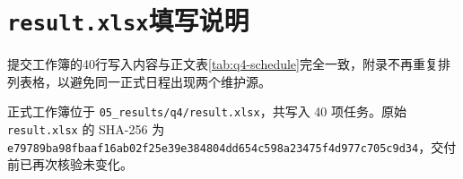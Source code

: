 \section{\texttt{result.xlsx}填写说明}

提交工作簿的40行写入内容与正文表\ref{tab:q4-schedule}完全一致，附录不再重复排列表格，以避免同一正式日程出现两个维护源。

正式工作簿位于 \texttt{05\_results/q4/result.xlsx}，共写入 40 项任务。原始 \texttt{result.xlsx} 的 SHA-256 为 \texttt{e79789ba98fbaaf16ab02f25e39e384804dd654c598a23475f4d977c705c9d34}，交付前已再次核验未变化。
